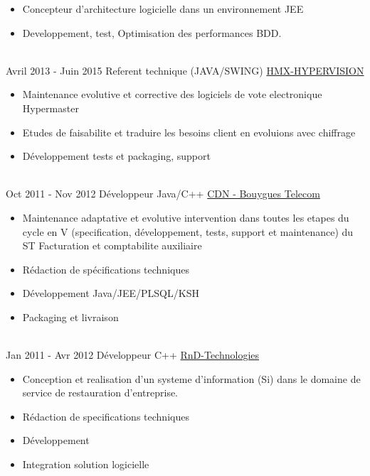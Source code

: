 \documentclass[letterpaper]{twentysecondcv} %
\begin{document}
\begin{twenty}
{{\begin{itemize}
     		des complements securitaires et d'integration au SI existant (Active Directory).
     		\item Concepteur d'architecture logicielle dans un environnement JEE
     		\item Developpement, test, Optimisation des performances BDD.
    \end{itemize}}
        }
     \\
     \twentyitem
   		{Avril 2013 -}
		{Juin 2015}
        {Referent technique (JAVA/SWING)}
        {\href{}{HMX-HYPERVISION}}
        {}
        {
        \begin{itemize}
        	\item Maintenance evolutive et corrective des logiciels de vote electronique Hypermaster
        	\item Etudes de faisabilite et traduire les besoins client en evoluions avec chiffrage
        	\item Développement tests et packaging, support
    \end{itemize}
    	}
        
       \\
        \twentyitem
        {Oct 2011 -}
        {Nov 2012}
        {Développeur Java/C++}
        {\href{https://www.jobs.bouyguestelecom.fr/}{CDN - Bouygues Telecom}}
        {}
        {
        	\begin{itemize}
        		\item Maintenance adaptative et evolutive intervention dans toutes les etapes du cycle en V (specification, développement, tests, support et maintenance) du ST Facturation et comptabilite auxiliaire
        		\item Rédaction de spécifications techniques
        		\item Développement Java/JEE/PLSQL/KSH
        		\item Packaging et livraison	
        	\end{itemize}
        }
    
           \\
    \twentyitem
    {Jan 2011 -}
    {Avr 2012}
    {Développeur C++}
    {\href{}{RnD-Technologies}}
    {}
    {
    	\begin{itemize}
		\item Conception et realisation d'un systeme d'information (Si) dans le domaine de service de restauration
		d'entreprise.
		\item Rédaction de specifications techniques
		\item Développement
		\item Integration solution logicielle	
    	\end{itemize}
    }


\end{twenty}
\end{document}
